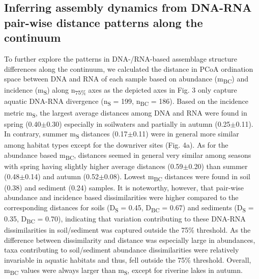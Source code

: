 \documentclass[12pt,a4paper]{article} %
\begin{document}
\subsection*{Inferring assembly dynamics from DNA-RNA pair-wise distance patterns along the continuum}
To further explore the patterns in DNA-/RNA-based assemblage structure differences along the continuum, we calculated the distance in PCoA ordination space between DNA and RNA of each sample based on abundance (m\textsubscript{BC}) and incidence (m\textsubscript{S}) along n\textsubscript{75\%} axes as the depicted axes in Fig. 3 only capture aquatic DNA-RNA divergence (n\textsubscript{S} = 199, n\textsubscript{BC} = 186). Based on the incidence metric m\textsubscript{S}, the largest average distances among DNA and RNA were found in spring (0.40$\pm$0.30) especially in soilwaters and partially in autumn (0.25$\pm$0.11). In contrary, summer m\textsubscript{S} distances (0.17$\pm$0.11) were in general more similar among habitat types except for the downriver sites (Fig. 4a). As for the abundance based m\textsubscript{BC}, distances seemed in general very similar among seasons with spring having slightly higher average distances (0.59$\pm$0.20) than summer (0.48$\pm$0.14) and autumn (0.52$\pm$0.08). Lowest m\textsubscript{BC} distances were found in soil (0.38) and sediment (0.24) samples. It is noteworthy, however, that pair-wise abundance and incidence based dissimilarities were higher compared to the corresponding distances for soils (D\textsubscript{S} = 0.45, D\textsubscript{BC} = 0.67) and sediments (D\textsubscript{S} = 0.35, D\textsubscript{BC} = 0.70), indicating that variation contributing to these DNA-RNA dissimilarities in soil/sediment was captured outside the 75\% threshold. As the difference between dissimilarity and distance was especially large in abundances, taxa contributing to soil/sediment abundance dissimilarities were relatively invariable in aquatic habitats and thus, fell outside the 75\% threshold. Overall, m\textsubscript{BC} values were always larger than m\textsubscript{S}, except for riverine lakes in autumn.
\end{document}
